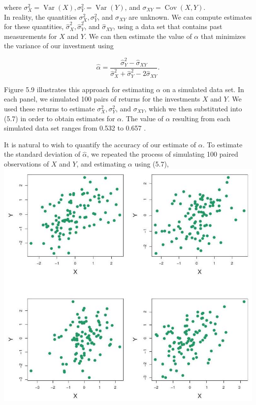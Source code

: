 \documentclass[10pt]{article}
\begin{document}
where $\sigma_{X}^{2}=\operatorname{Var}(X), \sigma_{Y}^{2}=\operatorname{Var}(Y)$, and $\sigma_{X Y}=\operatorname{Cov}(X, Y)$.\\
In reality, the quantities $\sigma_{X}^{2}, \sigma_{Y}^{2}$, and $\sigma_{X Y}$ are unknown. We can compute estimates for these quantities, $\hat{\sigma}_{X}^{2}, \hat{\sigma}_{Y}^{2}$, and $\hat{\sigma}_{X Y}$, using a data set that contains past measurements for $X$ and $Y$. We can then estimate the value of $\alpha$ that minimizes the variance of our investment using


\begin{equation*}
\hat{\alpha}=\frac{\hat{\sigma}_{Y}^{2}-\hat{\sigma}_{X Y}}{\hat{\sigma}_{X}^{2}+\hat{\sigma}_{Y}^{2}-2 \hat{\sigma}_{X Y}} . \tag{5.7}
\end{equation*}


Figure 5.9 illustrates this approach for estimating $\alpha$ on a simulated data set. In each panel, we simulated 100 pairs of returns for the investments $X$ and $Y$. We used these returns to estimate $\sigma_{X}^{2}, \sigma_{Y}^{2}$, and $\sigma_{X Y}$, which we then substituted into (5.7) in order to obtain estimates for $\alpha$. The value of $\hat{\alpha}$ resulting from each simulated data set ranges from 0.532 to 0.657 .

It is natural to wish to quantify the accuracy of our estimate of $\alpha$. To estimate the standard deviation of $\hat{\alpha}$, we repeated the process of simulating 100 paired observations of $X$ and $Y$, and estimating $\alpha$ using (5.7),\\
\includegraphics[max width=\textwidth, center]{2025_05_05_efe77898333945044de4g-203}
\end{document}
